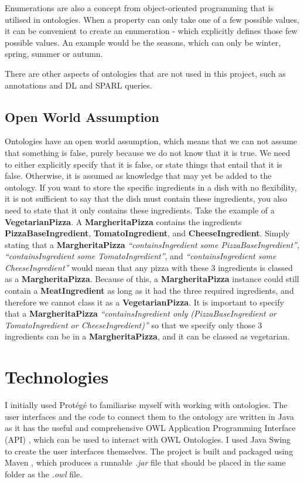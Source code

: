 Enumerations are also a concept from object-oriented programming that is utilised in ontologies. When a property can only take one of a few possible values, it can be convenient to create an enumeration - which explicitly defines those few possible values. An example would be the seasons, which can only be winter, spring, summer or autumn.

There are other aspects of ontologies that are not used in this project, such as annotations and DL and SPARL queries.

\subsection{Open World Assumption}

Ontologies have an open world assumption, which means that we can not assume that something is false, purely because we do not know that it is true. We need to either explicitly specify that it is false, or state things that entail that it is false. Otherwise, it is assumed as knowledge that may yet be added to the ontology. If you want to store the specific ingredients in a dish with no flexibility, it is not sufficient to say that the dish must contain these ingredients, you also need to state that it only contains these ingredients. Take the example of a \textbf{VegetarianPizza}. A \textbf{MargheritaPizza} contains the ingredients \textbf{PizzaBaseIngredient}, \textbf{TomatoIngredient}, and \textbf{CheeseIngredient}. Simply stating that a \textbf{MargheritaPizza} \textit{``containsIngredient some PizzaBaseIngredient''}, \textit{``containsIngredient some TomatoIngredient''}, and \textit{``containsIngredient some CheeseIngredient''} would mean that any pizza with these 3 ingredients is classed as a \textbf{MargheritaPizza}. Because of this, a \textbf{MargheritaPizza} instance could still contain a \textbf{MeatIngredient} as long as it had the three required ingredients, and therefore we cannot class it as a \textbf{VegetarianPizza}. It is important to specify that a \textbf{MargheritaPizza} \textit{``containsIngredient only (PizzaBaseIngredient or TomatoIngredient or CheeseIngredient)''} so that we specify only those 3 ingredients can be in a \textbf{MargheritaPizza}, and it can be classed as vegetarian. 

\section{Technologies}

I initially used Protégé to familiarise myself with working with ontologies. The user interfaces and the code to connect them to the ontology are written in Java as it has the useful and comprehensive OWL Application Programming Interface (API) \cite{owl_api}, which can be used to interact with OWL Ontologies. I used Java Swing to create the user interfaces themselves. The project is built and packaged using Maven \cite{maven} , which produces a runnable \textit{.jar} file that should be placed in the same folder as the \textit{.owl} file.

